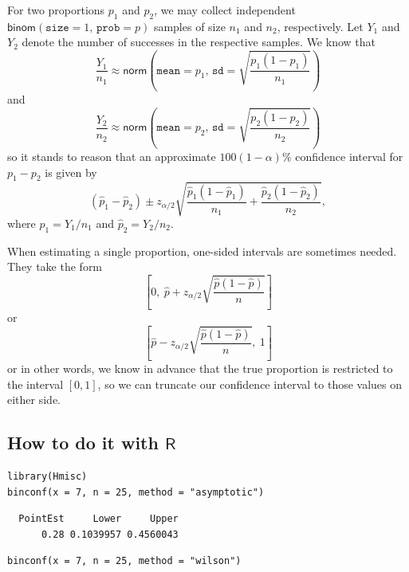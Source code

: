 \documentclass[captions=tableheading]{scrbook}
\begin{document}
For two proportions \(p_{1}\) and \(p_{2}\), we may collect independent \(\mathsf{binom}(\mathtt{size}=1,\,\mathtt{prob}=p)\) samples of size \(n_{1}\) and \(n_{2}\), respectively. Let \(Y_{1}\) and \(Y_{2}\) denote the number of successes in the respective samples. 
We know that
\[
\frac{Y_{1}}{n_{1}}\approx\mathsf{norm}\left(\mathtt{mean}=p_{1},\,\mathtt{sd}=\sqrt{\frac{p_{1}(1-p_{1})}{n_{1}}}\right)
\]
and
\[
\frac{Y_{2}}{n_{2}}\approx\mathsf{norm}\left(\mathtt{mean}=p_{2},\,\mathtt{sd}=\sqrt{\frac{p_{2}(1-p_{2})}{n_{2}}}\right)
\]
so it stands to reason that an approximate \(100(1-\alpha)\%\) confidence interval for \(p_{1}-p_{2}\) is given by
\begin{equation}
\left(\hat{p}_{1}-\hat{p}_{2}\right)\pm z_{\alpha/2}\sqrt{\frac{\hat{p}_{1}(1-\hat{p}_{1})}{n_{1}}+\frac{\hat{p}_{2}(1-\hat{p}_{2})}{n_{2}}},
\end{equation}
where \(\hat{p}_{1}=Y_{1}/n_{1}\) and \(\hat{p}_{2}=Y_{2}/n_{2}\).

\begin{rem}
When estimating a single proportion, one-sided intervals are sometimes needed. They take the form
\begin{equation}
\left[0,\ \hat{p}+z_{\alpha/2}\sqrt{\frac{\hat{p}(1-\hat{p})}{n}}\right]
\end{equation}
or
\begin{equation}
\left[\hat{p}-z_{\alpha/2}\sqrt{\frac{\hat{p}(1-\hat{p})}{n}},\ 1\right]
\end{equation}
or in other words, we know in advance that the true proportion is restricted to the interval \([0,1]\), so we can truncate our confidence interval to those values on either side.
\end{rem}
\subsection{How to do it with \(\mathsf{R}\)}
\label{sec-9-4-1}



\lstset{language=R}
\begin{lstlisting}
library(Hmisc)
binconf(x = 7, n = 25, method = "asymptotic")
\end{lstlisting}

\begin{verbatim}
  PointEst     Lower     Upper
      0.28 0.1039957 0.4560043
\end{verbatim}


\lstset{language=R}
\begin{lstlisting}
binconf(x = 7, n = 25, method = "wilson")
\end{lstlisting}
\end{document}
